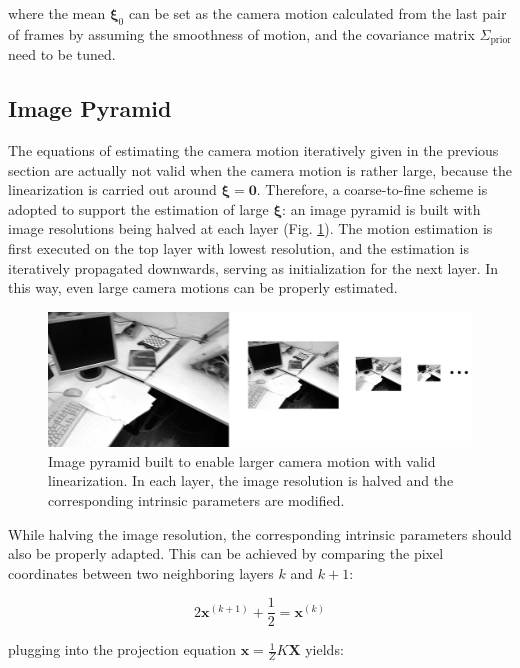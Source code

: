 \documentclass[acmsmall, nonacm, 11pt]{acmart}
\begin{document}
\noindent where the mean $\boldsymbol{\xi}_0$ can be set as the camera motion calculated from the last pair of frames by assuming the smoothness of motion, and the covariance matrix $\Sigma_{\text{prior}}$ need to be tuned.

\subsection{Image Pyramid}

The equations of estimating the camera motion iteratively given in the previous section are actually not valid when the camera motion is rather large, because the linearization is carried out around $\boldsymbol{\xi} = \mathbf{0}$. Therefore, a coarse-to-fine scheme is adopted to support the estimation of large $\boldsymbol{\xi}$: an image pyramid is built with image resolutions being halved at each layer (Fig. \ref{pyramid}). The motion estimation is first executed on the top layer with lowest resolution, and the estimation is iteratively propagated downwards, serving as initialization for the next layer. In this way, even large camera motions can be properly estimated.

\begin{figure}[h]
    \centering
    \includegraphics[width=\textwidth]{pyramid.jpg}
    \caption{Image pyramid built to enable larger camera motion with valid linearization. In each layer, the image resolution is halved and the corresponding intrinsic parameters are modified.}
    \label{pyramid}
\end{figure}

While halving the image resolution, the corresponding intrinsic parameters should also be properly adapted. This can be achieved by comparing the pixel coordinates between two neighboring layers $k$ and $k+1$:

\begin{equation}
2 \mathbf{x}^{(k+1)}+\frac{1}{2}=\mathbf{x}^{(k)}
\end{equation}

plugging into the projection equation $\mathbf{x}=\frac{1}{Z} K \mathbf{X}$ yields:
\end{document}

